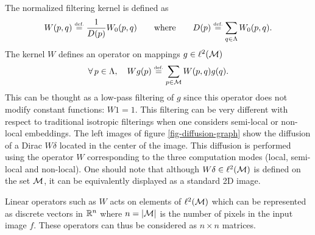 \documentclass[final]{siamltex}
\begin{document}
The normalized filtering kernel is defined as
\begin{equation}
	\label{eq-defn-continuous-normalization}
	W(p,q) \eqdef \frac{1}{D(p)} W_0(p,q) 
	\qqwhereqq
	D(p) \eqdef \sum_{q \in \La} W_0(p,q).
\end{equation}
The kernel $W$ defines an operator on mappings $g \in \ell^2(\mathcal{M})$
\begin{equation}
	\label{eq-defn-diffusion}
	\foralls p \in \La, \quad W g(p) \eqdef 
	\sum_{p \in \Mm} W(p,q) g(q).
\end{equation}
This can be thought as a low-pass filtering of $g$ since this operator does not modify constant functions:  $W 1 = 1$. This filtering can be very different with respect to traditional isotropic filterings when one considers semi-local or non-local embeddings. The left images of figure \ref{fig-diffusion-graph} show the diffusion of a Dirac $W \delta$ located in the center of the image. This diffusion is performed using the operator $W$ corresponding to the three computation modes (local, semi-local and non-local). One should note that although $W \delta \in \ell^2(\mathcal{M})$ is defined on the set $\mathcal{M}$, it can be equivalently displayed as a standard 2D image.

Linear operators such as $W$ acts on elements of $\ell^2(\mathcal{M})$ which can be represented as discrete vectors in $\mathbb{R}^n$ where $n=|\mathcal{M}|$ is the number of pixels in the input image $f$. These operators can thus be considered as $n \times n$ matrices.
\end{document}
